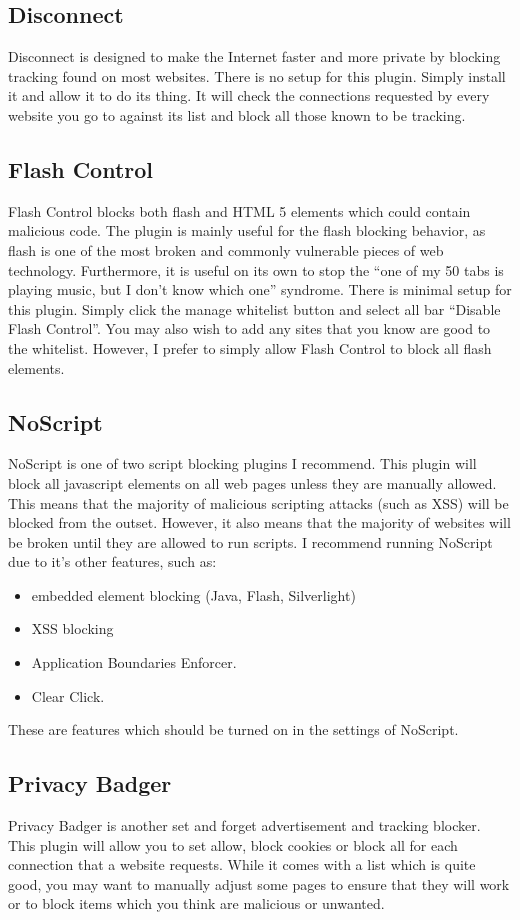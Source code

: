 \documentclass[a4paper,11pt]{report}
\begin{document}
		\subsection{Disconnect}
			Disconnect is designed to make the Internet faster and more private by blocking tracking found on most websites. 
			There is no setup for this plugin. Simply install it and allow it to do its thing. 
			It will check the connections requested by every website you go to against its list and block all those known to be tracking. 
		\subsection{Flash Control}
			Flash Control blocks both flash and HTML 5 elements which could contain malicious code. 
			The plugin is mainly useful for the flash blocking behavior, as flash is one of the most broken and commonly vulnerable pieces of web technology. 
			Furthermore, it is useful on its own to stop the ``one of my 50 tabs is playing music, but I don't know which one'' syndrome. 
			There is minimal setup for this plugin. Simply click the manage whitelist button and select all bar ``Disable Flash Control''. 
			You may also wish to add any sites that you know are good to the whitelist. 
			However, I prefer to simply allow Flash Control to block all flash elements. 
		\subsection{NoScript}
			NoScript is one of two script blocking plugins I recommend. 
			This plugin will block all javascript elements on all web pages unless they are manually allowed. 
			This means that the majority of malicious scripting attacks (such as XSS) will be blocked from the outset. 
			However, it also means that the majority of websites will be broken until they are allowed to run scripts. 
			I recommend running NoScript due to it's other features, such as:
			\begin{itemize}
				\item embedded element blocking (Java, Flash, Silverlight) 
				\item XSS blocking
				\item Application Boundaries Enforcer. 
				\item Clear Click. 
			\end{itemize}
			These are features which should be turned on in the settings of NoScript. 
		\subsection{Privacy Badger}
			Privacy Badger is another set and forget advertisement and tracking blocker. 
			This plugin will allow you to set allow, block cookies or block all for each connection that a website requests. 
			While it comes with a list which is quite good, you may want to manually adjust some pages to ensure that they will work or to block items which you think are malicious or unwanted. 
\end{document}
